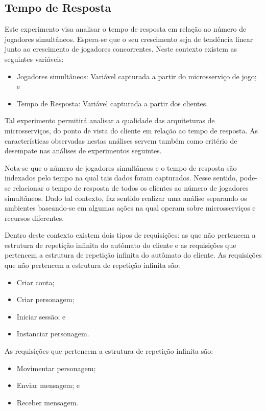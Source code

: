 \subsection{Tempo de Resposta}

Este experimento visa analisar o tempo de resposta em relação ao número de jogadores simultâneos.
%
Espera-se que o seu crescimento seja de tendência linear junto ao crescimento de jogadores concorrentes.
%
Neste contexto existem as seguintes variáveis:

\begin{itemize}
    \item Jogadores simultâneos: Variável capturada a partir do microsserviço de jogo; e
    \item Tempo de Resposta: Variável capturada a partir dos clientes.
\end{itemize}

Tal experimento permitirá analisar a qualidade das arquiteturas de microsserviços, do ponto de vista do cliente em relação ao tempo de resposta.
%
As características observadas nestas análises servem também como critério de desempate nas análises de experimentos seguintes.

Nota-se que o número de jogadores simultâneos e o tempo de resposta são indexados pelo tempo na qual tais dados foram capturados.
%
Nesse sentido, pode-se relacionar o tempo de resposta de todos os clientes ao número de jogadores simultâneos.
%
Dado tal contexto, faz sentido realizar uma análise separando os ambientes baseando-se em algumas ações na qual operam sobre microsserviços e recursos diferentes.

Dentro deste contexto existem dois tipos de requisições: as que não pertencem a estrutura de repetição infinita do autômato do cliente e as requisições que pertencem a estrutura de repetição infinita do autômato do cliente.
%
As requisições que não pertencem a estrutura de repetição infinita são:

\begin{itemize}
    \item Criar conta;
    \item Criar personagem;
    \item Iniciar sessão; e
    \item Instanciar personagem.
\end{itemize}

As requisições que pertencem a estrutura de repetição infinita são:

\begin{itemize}
    \item Movimentar personagem;
    \item Enviar mensagem; e
    \item Receber mensagem.
\end{itemize}



